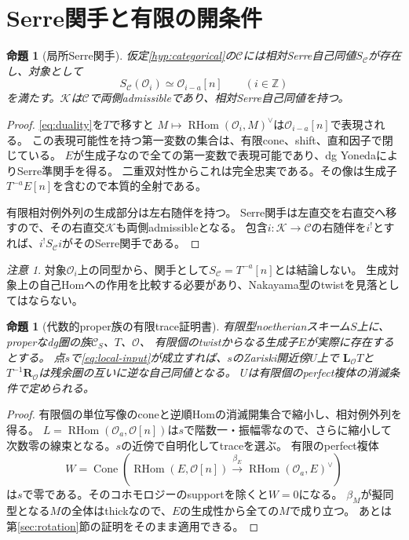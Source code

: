 \documentclass[a4paper,10pt]{ltjsarticle}
\newtheorem{proposition}[theorem]{命題}
\theoremstyle{definition}
\theoremstyle{remark}
\newtheorem{remark}[theorem]{注意}
\newcommand{\RHom}{\operatorname{RHom}}
\newcommand{\Cone}{\operatorname{Cone}}
\newcommand{\OO}{\mathcal O}
\newcommand{\cC}{\mathcal C}
\newcommand{\cK}{\mathcal K}
\newcommand{\LL}{\mathbf L}
\newcommand{\RR}{\mathbf R}
\begin{document}
\section{Serre関手と有限の開条件}\label{sec:serre}
\begin{proposition}[局所Serre関手]\label{prop:serre}
仮定\ref{hyp:categorical}の$\cC$には相対Serre自己同値$S_{\cC}$が存在し、対象として
\[
 S_{\cC}(\OO_i)\simeq\OO_{i-a}[n]\qquad(i\in\mathbb Z)
\]
を満たす。$\cK$は$\cC$で両側admissibleであり、相対Serre自己同値を持つ。
\end{proposition}
\begin{proof}
\eqref{eq:duality}を$T$で移すと
$M\mapsto\RHom(\OO_i,M)^\vee$は$\OO_{i-a}[n]$で表現される。
この表現可能性を持つ第一変数の集合は、有限cone、shift、直和因子で閉じている。
$E$が生成子なので全ての第一変数で表現可能であり、dg YonedaによりSerre準関手を得る。
二重双対性からこれは完全忠実である。その像は生成子$T^{-a}E[n]$を含むので本質的全射である。

有限相対例外列の生成部分は左右随伴を持つ。
Serre関手は左直交を右直交へ移すので、その右直交$\cK$も両側admissibleとなる。
包含$i:\cK\to\cC$の右随伴を$i^!$とすれば、$i^!S_{\cC}i$がそのSerre関手である。
\end{proof}

\begin{remark}
対象$\OO_i$上の同型から、関手として$S_{\cC}=T^{-a}[n]$とは結論しない。
生成対象上の自己Homへの作用を比較する必要があり、Nakayama型のtwistを見落としてはならない。
\end{remark}

\begin{proposition}[代数的proper族の有限trace証明書]\label{prop:open}
有限型noetherianスキーム$S$上に、properなdg圏の族$\cC_S$、$T$、$\OO$、
有限個のtwistからなる生成子$E$が実際に存在するとする。
点$s$で\eqref{eq:local-input}が成立すれば、$s$のZariski開近傍$U$上で
$\LL_{\OO}T$と$T^{-1}\RR_{\OO}$は残余圏の互いに逆な自己同値となる。
$U$は有限個のperfect複体の消滅条件で定められる。
\end{proposition}
\begin{proof}
有限個の単位写像のconeと逆順Homの消滅開集合で縮小し、相対例外列を得る。
$L=\RHom(\OO_a,\OO[n])$は$s$で階数一・振幅零なので、さらに縮小して
次数零の線束となる。$s$の近傍で自明化してtraceを選ぶ。
有限のperfect複体
\[
 W=\Cone\!\left(\RHom(E,\OO[n])
              \xrightarrow{\beta_E}\RHom(\OO_a,E)^\vee\right)
 \tag{FC}\label{eq:finite-certificate}
\]
は$s$で零である。そのコホモロジーのsupportを除くと$W=0$になる。
$\beta_M$が擬同型となる$M$の全体はthickなので、$E$の生成性から全ての$M$で成り立つ。
あとは第\ref{sec:rotation}節の証明をそのまま適用できる。
\end{proof}
\end{document}
